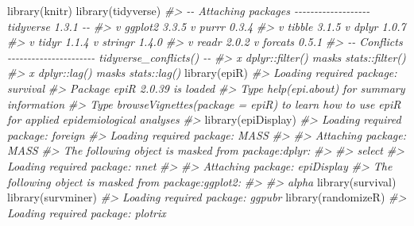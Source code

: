 \documentclass[
]{book}
\newenvironment{Shaded}{\begin{snugshade}}{\end{snugshade}}
\newcommand{\CommentTok}[1]{\textcolor[rgb]{0.56,0.35,0.01}{\textit{#1}}}
\newcommand{\FunctionTok}[1]{\textcolor[rgb]{0.00,0.00,0.00}{#1}}
\newcommand{\NormalTok}[1]{#1}
\begin{document}
\begin{Shaded}
\begin{Highlighting}[]
\FunctionTok{library}\NormalTok{(knitr)}
\FunctionTok{library}\NormalTok{(tidyverse)}
\CommentTok{\#\textgreater{} {-}{-} Attaching packages {-}{-}{-}{-}{-}{-}{-}{-}{-}{-}{-}{-}{-}{-}{-}{-}{-}{-}{-} tidyverse 1.3.1 {-}{-}}
\CommentTok{\#\textgreater{} v ggplot2 3.3.5     v purrr   0.3.4}
\CommentTok{\#\textgreater{} v tibble  3.1.5     v dplyr   1.0.7}
\CommentTok{\#\textgreater{} v tidyr   1.1.4     v stringr 1.4.0}
\CommentTok{\#\textgreater{} v readr   2.0.2     v forcats 0.5.1}
\CommentTok{\#\textgreater{} {-}{-} Conflicts {-}{-}{-}{-}{-}{-}{-}{-}{-}{-}{-}{-}{-}{-}{-}{-}{-}{-}{-}{-}{-}{-} tidyverse\_conflicts() {-}{-}}
\CommentTok{\#\textgreater{} x dplyr::filter() masks stats::filter()}
\CommentTok{\#\textgreater{} x dplyr::lag()    masks stats::lag()}
\FunctionTok{library}\NormalTok{(epiR)}
\CommentTok{\#\textgreater{} Loading required package: survival}
\CommentTok{\#\textgreater{} Package epiR 2.0.39 is loaded}
\CommentTok{\#\textgreater{} Type help(epi.about) for summary information}
\CommentTok{\#\textgreater{} Type browseVignettes(package = \textquotesingle{}epiR\textquotesingle{}) to learn how to use epiR for applied epidemiological analyses}
\CommentTok{\#\textgreater{} }
\FunctionTok{library}\NormalTok{(epiDisplay)}
\CommentTok{\#\textgreater{} Loading required package: foreign}
\CommentTok{\#\textgreater{} Loading required package: MASS}
\CommentTok{\#\textgreater{} }
\CommentTok{\#\textgreater{} Attaching package: \textquotesingle{}MASS\textquotesingle{}}
\CommentTok{\#\textgreater{} The following object is masked from \textquotesingle{}package:dplyr\textquotesingle{}:}
\CommentTok{\#\textgreater{} }
\CommentTok{\#\textgreater{}     select}
\CommentTok{\#\textgreater{} Loading required package: nnet}
\CommentTok{\#\textgreater{} }
\CommentTok{\#\textgreater{} Attaching package: \textquotesingle{}epiDisplay\textquotesingle{}}
\CommentTok{\#\textgreater{} The following object is masked from \textquotesingle{}package:ggplot2\textquotesingle{}:}
\CommentTok{\#\textgreater{} }
\CommentTok{\#\textgreater{}     alpha}
\FunctionTok{library}\NormalTok{(survival)}
\FunctionTok{library}\NormalTok{(survminer)}
\CommentTok{\#\textgreater{} Loading required package: ggpubr}
\FunctionTok{library}\NormalTok{(randomizeR)}
\CommentTok{\#\textgreater{} Loading required package: plotrix}
\end{Highlighting}
\end{Shaded}
\end{document}
